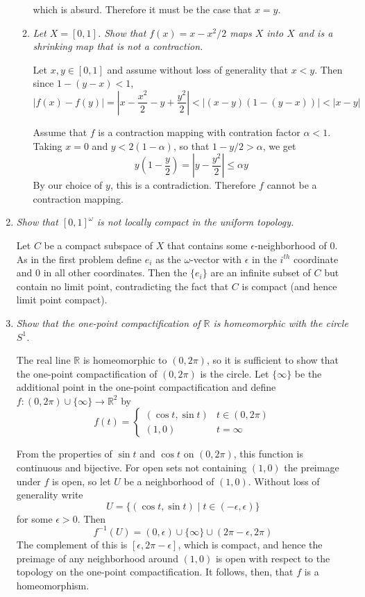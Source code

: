 \documentclass[10pt]{article}
\newcommand{\R}{\mathbb{R}}
\begin{document}
\begin{enumerate}
\begin{enumerate}
which is absurd.  Therefore it must be the case that $x=y$.

\item \emph{Let $X=[0,1]$.  Show that $f(x) = x - x^2/2$ maps $X$ into $X$ and is a shrinking map that is not a contraction.}

Let $x,y \in [0,1]$ and assume without loss of generality that $x < y$.  Then since $1-(y-x) < 1$, $$|f(x) - f(y)| = \left|x - \frac{x^2}{2} - y + \frac{y^2}{2}\right| < |(x-y)(1-(y-x))| < |x-y|$$

Assume that $f$ is a contraction mapping with contration factor $\alpha < 1$.  Taking $x = 0$ and $y < 2(1-\alpha)$, so that $1 - y/2 > \alpha$, we get $$y\left(1 - \frac{y}{2}\right) = \left|y - \frac{y^2}{2}\right| \leq \alpha y$$ By our choice of $y$, this is a contradiction.  Therefore $f$ cannot be a contraction mapping.
\end{enumerate}

\item \emph{Show that $[0,1]^\omega$ is not locally compact in the uniform topology.}

Let $C$ be a compact subspace of $X$ that contains some $\epsilon$-neighborhood of $0$.  As in the first problem define $e_i$ as the $\omega$-vector with $\epsilon$ in the $i^{th}$ coordinate and $0$ in all other coordinates.  Then the $\{e_i\}$ are an infinite subset of $C$ but contain no limit point, contradicting the fact that $C$ is compact (and hence limit point compact).

\item \emph{Show that the one-point compactification of $\R$ is homeomorphic with the circle $S^1$.}

The real line $\R$ is homeomorphic to $(0, 2\pi)$, so it is sufficient to show that the one-point compactification of $(0, 2\pi)$ is the circle.  Let $\{\infty\}$ be the additional point in the one-point compactification and define $f: (0,2\pi) \cup \{\infty\} \rightarrow \R^2$ by
\[
f(t) = \begin{cases} (\cos t, \sin t) & t \in (0, 2\pi) \\ (1,0) & t = \infty \end{cases}
\]

From the properties of $\sin t$ and $\cos t$ on $(0,2\pi)$, this function is continuous and bijective.  For open sets not containing $(1,0)$ the preimage under $f$ is open, so let $U$ be a neighborhood of $(1,0)$.  Without loss of generality write $$U = \{(\cos t, \sin t) \mid t \in (-\epsilon, \epsilon)\}$$ for some $\epsilon > 0$.  Then $$f^{-1}(U) = (0, \epsilon) \cup \{\infty\} \cup (2\pi - \epsilon, 2\pi)$$  The complement of this is $[\epsilon, 2\pi - \epsilon]$, which is compact, and hence the preimage of any neighborhood around $(1,0)$ is open with respect to the topology on the one-point compactification.  It follows, then, that $f$ is a homeomorphism.


\end{enumerate}
\end{document}
